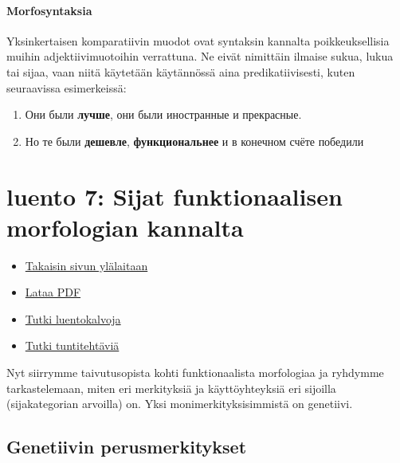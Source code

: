 \documentclass[]{scrartcl}
\providecommand{\tightlist}{%
  \setlength{\itemsep}{0pt}\setlength{\parskip}{0pt}}
\begin{document}
\paragraph{Morfosyntaksia}\label{morfosyntaksia}

Yksinkertaisen komparatiivin muodot ovat syntaksin kannalta
poikkeuksellisia muihin adjektiivimuotoihin verrattuna. Ne eivät
nimittäin ilmaise sukua, lukua tai sijaa, vaan niitä käytetään
käytännössä aina predikatiivisesti, kuten seuraavissa esimerkeissä:

\begin{enumerate}
\def\labelenumi{(\arabic{enumi})}
\setcounter{enumi}{21}
\tightlist
\item
  Они были \textbf{лучше}, они были иностранные и прекрасные.
\item
  Но те были \textbf{дешевле}, \textbf{функциональнее} и в конечном
  счёте победили
\end{enumerate}

\section{luento 7: Sijat funktionaalisen morfologian
kannalta}\label{luento-7-sijat-funktionaalisen-morfologian-kannalta}

\begin{itemize}
\tightlist
\item
  \href{https://mustikka.uta.fi/~juho_harme/morfologia/\#tästä-kurssista}{Takaisin
  sivun ylälaitaan}
\item
  \href{http://mustikka.uta.fi/~juho_harme/morfologia/materiaalit/luento7.pdf}{Lataa
  PDF}
\item
  \href{http://mustikka.uta.fi/~juho_harme/morfologia/presentations/luento7.html}{Tutki
  luentokalvoja}
\item
  \href{http://mustikka.uta.fi/~juho_harme/morfologia/tehtavat/luento7.pdf}{Tutki
  tuntitehtäviä}
\end{itemize}

Nyt siirrymme taivutusopista kohti funktionaalista morfologiaa ja
ryhdymme tarkastelemaan, miten eri merkityksiä ja käyttöyhteyksiä eri
sijoilla (sijakategorian arvoilla) on. Yksi monimerkityksisimmistä on
genetiivi.

\subsection{Genetiivin
perusmerkitykset}\label{genetiivin-perusmerkitykset}
\end{document}
